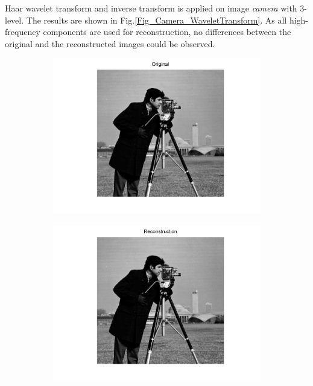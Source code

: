\documentclass[11pt]{article}
\begin{document}
Haar wavelet transform and inverse transform is applied on image \textit{camera} with 3-level. The results are shown in Fig.\ref{Fig_Camera_WaveletTransform}. As all high-frequency components are used for reconstruction, no differences between the original and the reconstructed images could be observed. 

\begin{figure}[H]
	\centering
	\begin{subfigure}{0.4\textwidth}
	  	\centering
		\includegraphics[trim=0.5in 0.1in 0.5in 0in, width=\textwidth]{Fig_Camera_Original.png}        
		\caption{}
	    \label{Fig_Camera_Original}	    
    \end{subfigure}
	\begin{subfigure}{0.4\textwidth}
        \centering
		\includegraphics[trim=0.5in 0.1in 0.5in 0in, width=\textwidth]{Fig_Camera_Reconstruction.png}

\end{subfigure}
\end{figure}
\end{document}

